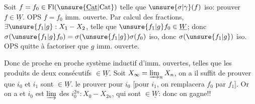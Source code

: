 Soit $f=f_0\in\operatorname{Fl}(\unsure{\underline{\mathrm{Cat}}|\mathrm{Cat}})$  telle que $\unsure{\sigma|\gamma}(f)$ iso: prouver $f\in\underline W$. OPS $f=f_0$ imm. ouverte. Par calcul des fractions, $\exists\unsure{f_1|g}:X_1\mathbin{-}X_2$, telle que $\unsure{f_1|g}f_0\in\underline W$; donc $\sigma(\unsure{f_1|g}f_0)=\sigma(\unsure{f_1|g})\sigma(f_0)$ iso, donc $\sigma(\unsure{f_1|g})$ iso. OPS quitte à factoriser que $g$ imm. ouverte.


Donc de proche en proche
système inductif d'imm. ouvertes, telles que les produits de deux consécutifs  $\in\underline W$. Soit $X_\infty=\varinjlim_n X_n$, on a
il suffit de prouver que $i_0$ et $i_1$ sont $\in\underline W$.
  le prouver pour $i_0$  [pour $i_1$, on remplacera $f_0$ par $f_1$]. Or on a
et $i_0$ est $\varinjlim$ des $i_0^{2n}:X_0\mathbin{-}X_{2n}$, qui sont $\in\underline W$: donc on gagne!!

